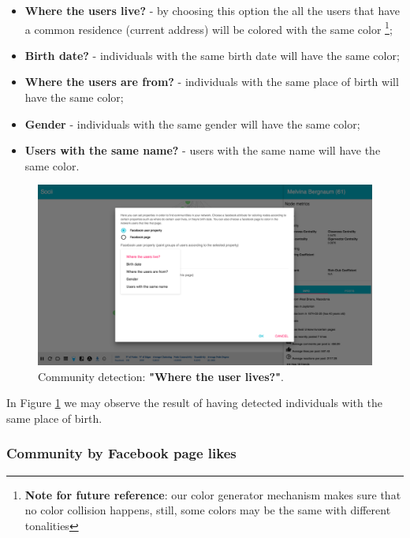 \begin{itemize}
    \item \textbf{Where the users live?} - by choosing this option the all the users that have a common residence (current address) will be colored with the same color \footnote{\textbf{Note for future reference}: our color generator mechanism makes sure that no color collision happens, still, some colors may be the same with different tonalities};
    \item \textbf{Birth date?} - individuals with the same birth date will have the same color;
    \item \textbf{Where the users are from?} - individuals with the same place of birth will have the same color;
    \item \textbf{Gender} - individuals with the same gender will have the same color;
    \item \textbf{Users with the same name?} - users with the same name will have the same color.
\end{itemize}

\begin{figure}[h!]
\begin{center}
  \hspace*{-0.8in}
  \includegraphics[width=1.2\textwidth]{img/socii/socii_8.png}
\end{center}
\caption{\label{img:socii_9} Community detection: \textbf{"Where the user lives?"}.}
\end{figure}

In Figure \ref{img:socii_9} we may observe the result of having detected individuals with the same place of birth.

\subsubsection*{Community by Facebook page likes}

